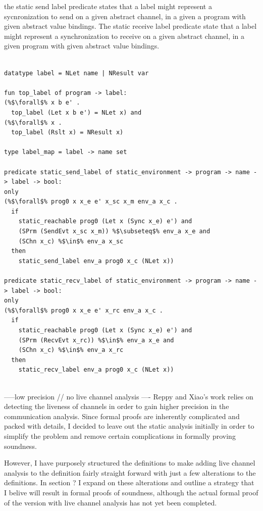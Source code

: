 \documentclass{article}
\begin{document}
the static send label predicate states that a label might represent a sycnronization to send on
a given abstract channel, in a given a program with given abstract value bindings.  The static
receive label predicate state that a label might represent a synchronization to receive on a
given abstract channel, in a given program with given abstract value bindings. 

\begin{lstlisting}[language=logic, escapechar=\%]

datatype label = NLet name | NResult var

fun top_label of program -> label:
(%$\forall$% x b e' . 
  top_label (Let x b e') = NLet x) and
(%$\forall$% x . 
  top_label (Rslt x) = NResult x)

type label_map = label -> name set

predicate static_send_label of static_environment -> program -> name -> label -> bool:
only
(%$\forall$% prog0 x x_e e' x_sc x_m env_a x_c .
  if
    static_reachable prog0 (Let x (Sync x_e) e') and
    (SPrm (SendEvt x_sc x_m)) %$\subseteq$% env_a x_e and 
    (SChn x_c) %$\in$% env_a x_sc
  then
    static_send_label env_a prog0 x_c (NLet x))

predicate static_recv_label of static_environment -> program -> name -> label -> bool:
only
(%$\forall$% prog0 x x_e e' x_rc env_a x_c .
  if
    static_reachable prog0 (Let x (Sync x_e) e') and
    (SPrm (RecvEvt x_rc)) %$\in$% env_a x_e and 
    (SChn x_c) %$\in$% env_a x_rc 
  then
    static_recv_label env_a prog0 x_c (NLet x))


\end{lstlisting}

-----low precision // no live channel analysis ----
Reppy and Xiao's work relies on detecting the liveness of channels in order to gain higher
precision in the communication analysis.  Since formal proofs are inherently complicated and
packed with details, I decided to leave out the static analysis initially in order to simplify
the problem and remove certain complications in formally proving soundness.

However, I have purposely
structured the definitions to make adding live channel analysis to the definition fairly  
straight forward with just a few alterations to the definitions.  In section ? I expand on
these alterations and outline a strategy that I belive will result in formal proofs of
soundness,
although the actual formal proof of the version with live channel analysis has not yet been
completed.  
\end{document}
